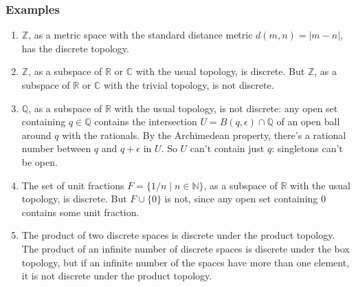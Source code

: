 \documentclass[12pt]{article}
\begin{document}
\subsubsection*{Examples}
\begin{enumerate}
\item
$\mathbb{Z}$, as a metric space with the standard distance metric $d(m,n)=|m-n|$, has the discrete topology.
\item
$\mathbb{Z}$, as a subspace of $\mathbb{R}$ or $\mathbb{C}$ with the usual topology, is discrete.  But $\mathbb{Z}$, as a subspace of $\mathbb{R}$ or $\mathbb{C}$ with the trivial topology, is not discrete.
\item
$\mathbb{Q}$, as a subspace of $\mathbb{R}$ with the usual topology, is not discrete: any open set containing $q\in \mathbb{Q}$ contains the intersection $U=B(q,\epsilon)\cap \mathbb{Q}$ of an open ball around $q$ with the rationals.  By the Archimedean property, there's a rational number between $q$ and $q+\epsilon$ in $U$.  So $U$ can't contain just $q$: singletons can't be open.
\item
The set of unit fractions $F=\{1/n \mid n\in \mathbb{N}\}$, as a subspace of $\mathbb{R}$ with the usual topology, is discrete.  But $F\cup\{0\}$ is not, since any open set containing $0$ contains some unit fraction.
\item
The product of two discrete spaces is discrete under the product topology.  The product of an infinite number of discrete spaces is discrete under the box topology, but if an infinite number of the spaces have more than one element, it is not discrete under the product topology.
\end{enumerate}
\end{document}
